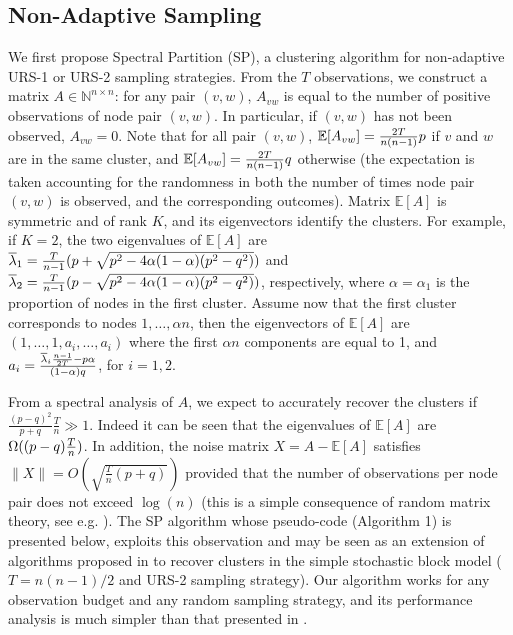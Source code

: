 \subsection{Non-Adaptive Sampling}

We first propose Spectral Partition (SP), a clustering algorithm for non-adaptive URS-1 or URS-2 sampling strategies. From the $T$ observations, we construct a matrix $A\in\mathbb{N}^{n\times n}$: for any pair $(v,w)$, $A_{vw}$ is equal to the number of positive observations of node pair $(v,w)$. In particular, if $(v,w)$ has not been observed, $A_{vw}=0$. Note that for all pair $(v,w)$, $\mathbb{E}[A_{vw}]={2T\over n(n-1)}p$ if $v$ and $w$ are in the same cluster, and 
$\mathbb{E}[A_{vw}]={2T\over n(n-1)}q$ otherwise (the expectation is taken accounting for the randomness in both the number of times node pair $(v,w)$ is observed, and the corresponding outcomes). Matrix $\mathbb{E}[A]$ is symmetric and of rank $K$, and its eigenvectors identify the clusters. For example, if $K=2$, the two eigenvalues of $\mathbb{E}[A]$ are $\overline{\lambda}_1={T\over n-1}(p+\sqrt{p^2-4\alpha(1-\alpha)(p^2-q^2)})$ and $\overline{\lambda}_2={T\over n-1}(p-\sqrt{p^2-4\alpha(1-\alpha)(p^2-q^2)})$, respectively, where $\alpha=\alpha_1$ is the proportion of nodes in the first cluster. Assume now that the first cluster corresponds to nodes $1,\ldots,\alpha n$, then the eigenvectors of $\mathbb{E}[A]$ are $(1,\ldots,1,a_i,\ldots,a_i)$ where the first $\alpha n$ components are equal to 1, and $a_i={\overline{\lambda}_i{n-1\over 2T}-p\alpha\over (1-\alpha)q}$, for $i=1,2$.  

From a spectral analysis of $A$, we expect to accurately recover the clusters if $\frac{(p-q)^2}{p+q}\frac{T}{n} \gg 1$. Indeed it can be seen that the eigenvalues of $\mathbb{E}[A]$ are $\Omega((p-q){T\over n})$. In addition, the noise matrix $X=A-\mathbb{E}[A]$ satisfies $\| X \| =O (\sqrt{\frac{T}{n}(p+q)})$ provided that the number of observations per node pair does not exceed $\log(n)$ (this is a simple consequence of random matrix theory, see e.g. \cite{tao2012, chatterjee2012}). The SP algorithm whose pseudo-code (Algorithm 1) is presented below, exploits this observation and may be seen as an extension of algorithms proposed in \cite{coja2010} to recover clusters in the simple stochastic block model ($T=n(n-1)/2$ and URS-2 sampling strategy). Our algorithm works for any observation budget and any random sampling strategy, and its performance analysis is much simpler than that presented in \cite{coja2010}.


